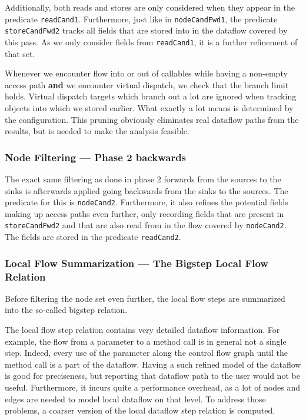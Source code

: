 Additionally, both reads and stores are only considered when they appear in the 
predicate \texttt{readCand1}.
Furthermore, just like in \texttt{nodeCandFwd1}, the predicate 
\texttt{storeCandFwd2} tracks all fields that are stored into in the dataflow
covered by this pass.
As we only consider fields from \texttt{readCand1}, it is a further refinement 
of that set.

Whenever we encounter flow into or out of callables while having a non-empty 
access path \textbf{and} we encounter virtual dispatch,
we check that the branch limit holds.
Virtual dispatch targets which branch out a lot are ignored when tracking objects 
into which we stored earlier. What exactly a lot means is determined by the 
configuration.
This pruning obviously eliminates real dataflow paths from the results, but is needed
to make the analysis feasible.

\subsubsection*{Node Filtering --- Phase 2 backwards}
The exact same filtering as done in phase 2 forwards from the sources to the sinks 
is afterwards applied going backwards from the sinks to the sources.
The predicate for this is \texttt{nodeCand2}.
Furthermore, it also refines the potential fields making up access paths even further,
only recording fields that are present in \texttt{storeCandFwd2} and that are 
also read from in the flow covered by \texttt{nodeCand2}.
The fields are stored in the predicate \texttt{readCand2}.


\subsubsection*{Local Flow Summarization --- The Bigstep Local Flow Relation}
Before filtering the node set even further, the local flow steps are summarized 
into the so-called bigstep relation.

The local flow step relation contains very detailed dataflow information.
For example, the flow from a parameter to a method call 
is in general not a single step.
Indeed, every use of the parameter along the control flow graph until the method 
call is a part of the dataflow.
Having a such refined model of the dataflow is good for preciseness, but 
reporting that dataflow path to the user would not be useful.
Furthermore, it incurs quite a performance overhead, as a lot of nodes and edges 
are needed to model local dataflow on that level.
To address those problems, a coarser version of the 
local dataflow step relation is computed.

